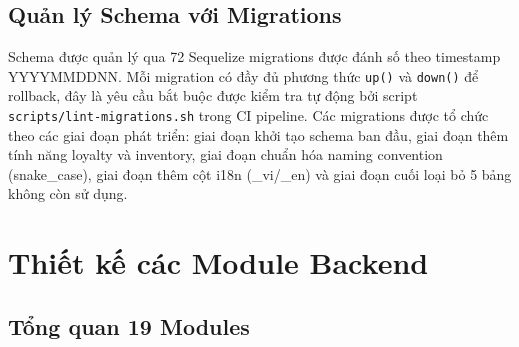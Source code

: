 \subsection{Quản lý Schema với Migrations}

Schema được quản lý qua 72 Sequelize migrations được đánh số theo timestamp YYYYMMDDNN. Mỗi migration có đầy đủ phương thức \texttt{up()} và \texttt{down()} để rollback, đây là yêu cầu bắt buộc được kiểm tra tự động bởi script \texttt{scripts/lint-migrations.sh} trong CI pipeline. Các migrations được tổ chức theo các giai đoạn phát triển: giai đoạn khởi tạo schema ban đầu, giai đoạn thêm tính năng loyalty và inventory, giai đoạn chuẩn hóa naming convention (snake\_case), giai đoạn thêm cột i18n (\_vi/\_en) và giai đoạn cuối loại bỏ 5 bảng không còn sử dụng.

\section{Thiết kế các Module Backend}

\subsection{Tổng quan 19 Modules}

